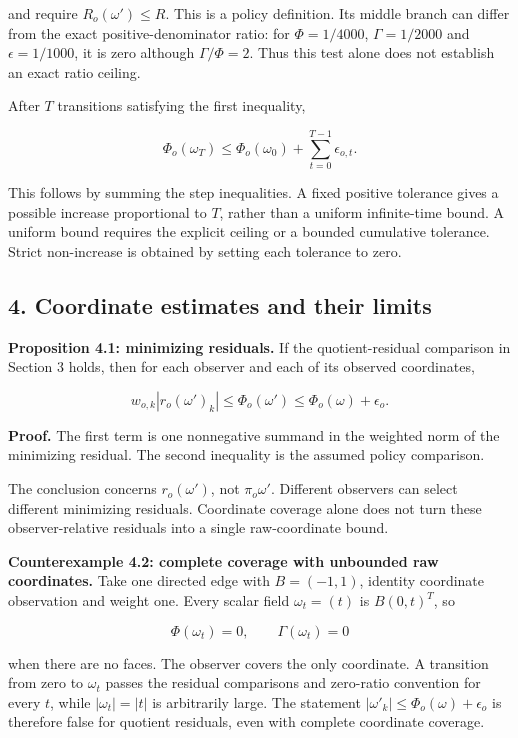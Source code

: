\documentclass[
]{article}
\begin{document}
and require \(R_o(\omega')\le R\). This is a policy definition. Its
middle branch can differ from the exact positive-denominator ratio: for
\(\Phi=1/4000\), \(\Gamma=1/2000\) and \(\epsilon=1/1000\), it is zero
although \(\Gamma/\Phi=2\). Thus this test alone does not establish an
exact ratio ceiling.

After \(T\) transitions satisfying the first inequality,

\[
\Phi_o(\omega_T)\le\Phi_o(\omega_0)+
\sum_{t=0}^{T-1}\epsilon_{o,t}.
\]

This follows by summing the step inequalities. A fixed positive
tolerance gives a possible increase proportional to \(T\), rather than a
uniform infinite-time bound. A uniform bound requires the explicit
ceiling or a bounded cumulative tolerance. Strict non-increase is
obtained by setting each tolerance to zero.

\subsection{4. Coordinate estimates and their
limits}\label{coordinate-estimates-and-their-limits}

\textbf{Proposition 4.1: minimizing residuals.} If the quotient-residual
comparison in Section 3 holds, then for each observer and each of its
observed coordinates,

\[
w_{o,k}|r_o(\omega')_k|
\le\Phi_o(\omega')\le\Phi_o(\omega)+\epsilon_o.
\]

\textbf{Proof.} The first term is one nonnegative summand in the
weighted norm of the minimizing residual. The second inequality is the
assumed policy comparison.

The conclusion concerns \(r_o(\omega')\), not \(\pi_o\omega'\).
Different observers can select different minimizing residuals.
Coordinate coverage alone does not turn these observer-relative
residuals into a single raw-coordinate bound.

\textbf{Counterexample 4.2: complete coverage with unbounded raw
coordinates.} Take one directed edge with \(B=(-1,1)\), identity
coordinate observation and weight one. Every scalar field
\(\omega_t=(t)\) is \(B(0,t)^T\), so

\[
\Phi(\omega_t)=0,\qquad \Gamma(\omega_t)=0
\]

when there are no faces. The observer covers the only coordinate. A
transition from zero to \(\omega_t\) passes the residual comparisons and
zero-ratio convention for every \(t\), while \(|\omega_t|=|t|\) is
arbitrarily large. The statement
\(|\omega'_k|\le\Phi_o(\omega)+\epsilon_o\) is therefore false for
quotient residuals, even with complete coordinate coverage.
\end{document}
